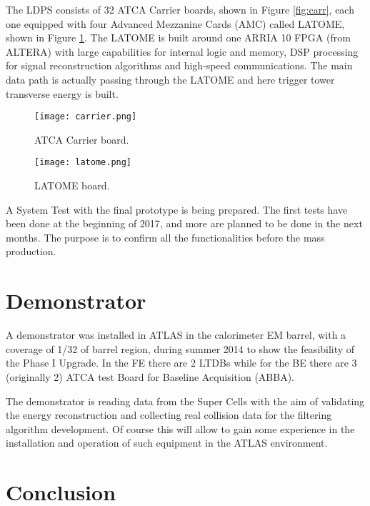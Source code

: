 \documentclass{llncs}
\begin{document}
The LDPS consists of 32 ATCA Carrier boards, shown in Figure \ref{fig:carr}, each one equipped with four Advanced Mezzanine Cards (AMC) called LATOME, shown in Figure \ref{fig:lat}. 
The LATOME is built around one ARRIA 10 FPGA (from ALTERA) with large capabilities for internal logic and memory, DSP processing for signal reconstruction algorithms and high-speed communications. The main data path is actually passing through the LATOME and here trigger tower transverse energy is built.
\begin{figure}[h]
\begin{minipage}[t]{0.45\textwidth}
		\centering
		\texttt{[image: carrier.png]}
		\caption{ATCA Carrier board.}
		\label{fig:carr}
\end{minipage}
\begin{minipage}[t]{0.55\textwidth}
		\centering
		\texttt{[image: latome.png]}
		\caption{LATOME board.}
		\label{fig:lat}
\end{minipage}
\end{figure}

A System Test with the final prototype is being prepared. The first tests have been done at the beginning of 2017, and more are planned to be done in the next months. The purpose is to confirm all the functionalities before the mass production.

\section{Demonstrator}
A demonstrator was installed in ATLAS in the calorimeter EM barrel, with a coverage of 1/32 of barrel region, during summer 2014 to show the feasibility of the Phase I Upgrade. In the FE there are 2 LTDBs while for the BE there are 3 (originally 2) ATCA test Board for Baseline Acquisition (ABBA).

The demonstrator is reading data from the Super Cells with the aim of validating the energy reconstruction and collecting real collision data for the filtering algorithm development. Of course this will allow to gain some experience in the installation and operation of such equipment in the ATLAS environment.


\section{Conclusion}



\end{document}
